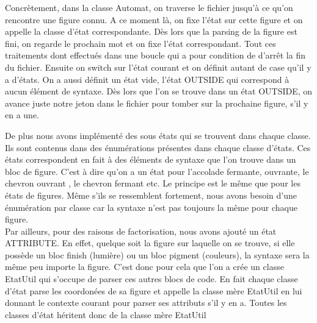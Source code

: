 \documentclass[../../Rapport RayTracer]{subfiles}
\begin{document}
Concrètement, dans la classe Automat, on traverse le fichier jusqu'à ce qu'on rencontre une figure connu. A ce moment là, on fixe l'état sur cette figure et on appelle la classe d'état correspondante. Dès lors que la parsing de la figure est fini, on regarde le prochain mot et on fixe l'état correspondant. Tout ces traitements dont effectués dans une boucle qui a pour condition de d'arrêt la fin du fichier. Ensuite on switch sur l'état courant et on définit autant de case qu'il y a d'états. On a aussi définit un état vide, l'état OUTSIDE qui correspond à aucun élément de syntaxe. Dès lors que l'on se trouve dans un état OUTSIDE, on avance juste notre jeton dans le fichier pour tomber sur la prochaine figure, s'il y en a une.
\begin{adjustbox}{max width=\textwidth}
 
\end{adjustbox} 
De plus nous avons implémenté des sous états qui se trouvent dans chaque classe. Ils sont contenus dans des énumérations présentes dans chaque classe d'états. Ces états correspondent en fait à des éléments de syntaxe que l'on trouve dans un bloc de figure. C'est à dire qu'on a un état pour l'accolade fermante, ouvrante, le chevron ouvrant , le chevron fermant etc.
Le principe est le même que pour les états de figures. Même s'ils se ressemblent fortement, nous avons besoin d'une énumération par classe car la syntaxe n'est pas toujours la même pour chaque figure.
\\

Par ailleurs, pour des raisons de factorisation, nous avons ajouté un état ATTRIBUTE. En effet, quelque soit la figure sur laquelle on se trouve, si elle possède un bloc finish (lumière) ou un bloc pigment (couleurs), la syntaxe sera la même peu importe la figure. C'est donc pour cela que l'on a crée un classe EtatUtil qui s'occupe de parser ces autres blocs de code. En fait chaque classe d'état parse les coordonées de sa figure et appelle la classe mère EtatUtil en lui donnant le contexte courant pour parser ses attributs s'il y en a. Toutes les classes d'état héritent donc de la classe mère EtatUtil
\end{document}
